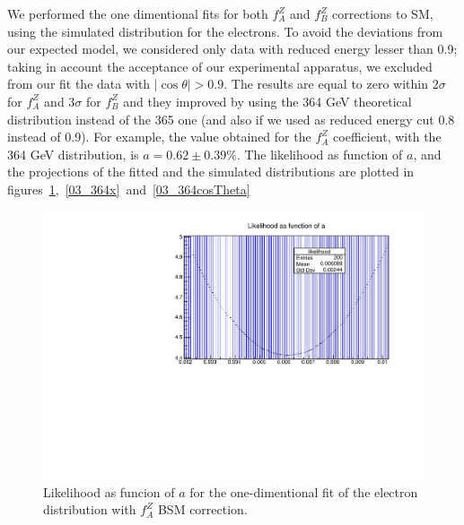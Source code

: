 We performed the one dimentional fits for both $f_A^Z$ and $f_B^Z$ corrections to SM, using the simulated distribution for the electrons. To avoid the deviations from our expected model, we considered only data with reduced energy lesser than 0.9; taking in account the acceptance of our experimental apparatus, we excluded from our fit the data with $\lvert\cos\theta\rvert > 0.9$. The results are equal to zero within $2\sigma$ for $f_A^Z$ and $3\sigma$ for $f_B^Z$ and they improved by using the 364 GeV theoretical distribution instead of the 365 one (and also if we used as reduced energy cut 0.8 instead of 0.9). For example, the value obtained for the $f_A^Z$ coefficient, with the 364 GeV distribution, is $ a = 0.62 \pm 0.39 \%$. The likelihood as function of $a$, and the projections of the fitted and the simulated distributions are plotted in figures~\ref{03_364likelihood},~\ref{03_364x}~and~\ref{03_364cosTheta}

\begin{figure} [htp]
\centering
\includegraphics[scale=0.7]{03_364likelihood.pdf}
\caption{Likelihood as funcion of $a$ for the one-dimentional fit of the electron distribution with $f_A^Z$ BSM correction.}
\label{03_364likelihood}
\end{figure}

